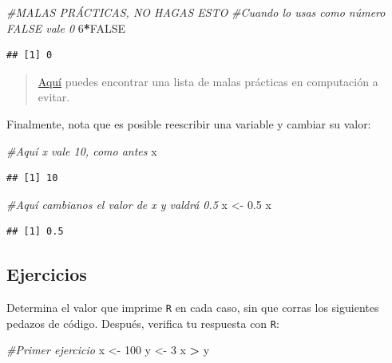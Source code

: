 \documentclass[
]{book}
\newenvironment{Shaded}{\begin{snugshade}}{\end{snugshade}}
\newcommand{\CommentTok}[1]{\textcolor[rgb]{0.56,0.35,0.01}{\textit{#1}}}
\newcommand{\DecValTok}[1]{\textcolor[rgb]{0.00,0.00,0.81}{#1}}
\newcommand{\FloatTok}[1]{\textcolor[rgb]{0.00,0.00,0.81}{#1}}
\newcommand{\NormalTok}[1]{#1}
\newcommand{\OperatorTok}[1]{\textcolor[rgb]{0.81,0.36,0.00}{\textbf{#1}}}
\newcommand{\OtherTok}[1]{\textcolor[rgb]{0.56,0.35,0.01}{#1}}
\newcommand{\StringTok}[1]{\textcolor[rgb]{0.31,0.60,0.02}{#1}}
\begin{document}
\begin{Shaded}
\begin{Highlighting}[]
\CommentTok{#MALAS PRÁCTICAS, NO HAGAS ESTO}
\CommentTok{#Cuando lo usas como número FALSE vale 0}
\DecValTok{6}\OperatorTok{*}\OtherTok{FALSE}
\end{Highlighting}
\end{Shaded}

\begin{verbatim}
## [1] 0
\end{verbatim}

\begin{quote}
\href{https://medium.com/mindorks/common-bad-programming-practices-7fb470ed74d2}{Aquí} puedes encontrar una lista de malas prácticas en computación a evitar.
\end{quote}

Finalmente, nota que es posible reescribir una variable y cambiar su valor:

\begin{Shaded}
\begin{Highlighting}[]
\CommentTok{#Aquí x vale 10, como antes}
\NormalTok{x}
\end{Highlighting}
\end{Shaded}

\begin{verbatim}
## [1] 10
\end{verbatim}

\begin{Shaded}
\begin{Highlighting}[]
\CommentTok{#Aquí cambianos el valor de x y valdrá 0.5}
\NormalTok{x <-}\StringTok{ }\FloatTok{0.5}
\NormalTok{x}
\end{Highlighting}
\end{Shaded}

\begin{verbatim}
## [1] 0.5
\end{verbatim}

\hypertarget{ejercicios}{%
\subsection{Ejercicios}\label{ejercicios}}

Determina el valor que imprime \texttt{R} en cada caso, sin que corras los siguientes pedazos de código. Después, verifica tu respuesta con \texttt{R}:

\begin{Shaded}
\begin{Highlighting}[]
\CommentTok{#Primer ejercicio}
\NormalTok{x <-}\StringTok{ }\DecValTok{100}
\NormalTok{y <-}\StringTok{ }\DecValTok{3}
\NormalTok{x }\OperatorTok{>}\StringTok{ }\NormalTok{y}
\end{Highlighting}
\end{Shaded}
\end{document}
